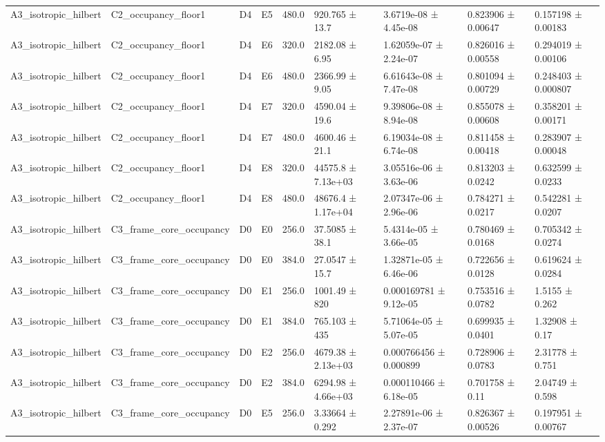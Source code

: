 \begin{table}
\begin{tabular}{lllllllll}
A3\_isotropic\_hilbert & C2\_occupancy\_floor1 & D4 & E5 & 480.0 & 920.765 ± 13.7 & 3.6719e-08 ± 4.45e-08 & 0.823906 ± 0.00647 & 0.157198 ± 0.00183 \\
A3\_isotropic\_hilbert & C2\_occupancy\_floor1 & D4 & E6 & 320.0 & 2182.08 ± 6.95 & 1.62059e-07 ± 2.24e-07 & 0.826016 ± 0.00558 & 0.294019 ± 0.00106 \\
A3\_isotropic\_hilbert & C2\_occupancy\_floor1 & D4 & E6 & 480.0 & 2366.99 ± 9.05 & 6.61643e-08 ± 7.47e-08 & 0.801094 ± 0.00729 & 0.248403 ± 0.000807 \\
A3\_isotropic\_hilbert & C2\_occupancy\_floor1 & D4 & E7 & 320.0 & 4590.04 ± 19.6 & 9.39806e-08 ± 8.94e-08 & 0.855078 ± 0.00608 & 0.358201 ± 0.00171 \\
A3\_isotropic\_hilbert & C2\_occupancy\_floor1 & D4 & E7 & 480.0 & 4600.46 ± 21.1 & 6.19034e-08 ± 6.74e-08 & 0.811458 ± 0.00418 & 0.283907 ± 0.00048 \\
A3\_isotropic\_hilbert & C2\_occupancy\_floor1 & D4 & E8 & 320.0 & 44575.8 ± 7.13e+03 & 3.05516e-06 ± 3.63e-06 & 0.813203 ± 0.0242 & 0.632599 ± 0.0233 \\
A3\_isotropic\_hilbert & C2\_occupancy\_floor1 & D4 & E8 & 480.0 & 48676.4 ± 1.17e+04 & 2.07347e-06 ± 2.96e-06 & 0.784271 ± 0.0217 & 0.542281 ± 0.0207 \\
A3\_isotropic\_hilbert & C3\_frame\_core\_occupancy & D0 & E0 & 256.0 & 37.5085 ± 38.1 & 5.4314e-05 ± 3.66e-05 & 0.780469 ± 0.0168 & 0.705342 ± 0.0274 \\
A3\_isotropic\_hilbert & C3\_frame\_core\_occupancy & D0 & E0 & 384.0 & 27.0547 ± 15.7 & 1.32871e-05 ± 6.46e-06 & 0.722656 ± 0.0128 & 0.619624 ± 0.0284 \\
A3\_isotropic\_hilbert & C3\_frame\_core\_occupancy & D0 & E1 & 256.0 & 1001.49 ± 820 & 0.000169781 ± 9.12e-05 & 0.753516 ± 0.0782 & 1.5155 ± 0.262 \\
A3\_isotropic\_hilbert & C3\_frame\_core\_occupancy & D0 & E1 & 384.0 & 765.103 ± 435 & 5.71064e-05 ± 5.07e-05 & 0.699935 ± 0.0401 & 1.32908 ± 0.17 \\
A3\_isotropic\_hilbert & C3\_frame\_core\_occupancy & D0 & E2 & 256.0 & 4679.38 ± 2.13e+03 & 0.000766456 ± 0.000899 & 0.728906 ± 0.0783 & 2.31778 ± 0.751 \\
A3\_isotropic\_hilbert & C3\_frame\_core\_occupancy & D0 & E2 & 384.0 & 6294.98 ± 4.66e+03 & 0.000110466 ± 6.18e-05 & 0.701758 ± 0.11 & 2.04749 ± 0.598 \\
A3\_isotropic\_hilbert & C3\_frame\_core\_occupancy & D0 & E5 & 256.0 & 3.33664 ± 0.292 & 2.27891e-06 ± 2.37e-07 & 0.826367 ± 0.00526 & 0.197951 ± 0.00767 \\

\end{tabular}
\end{table}
